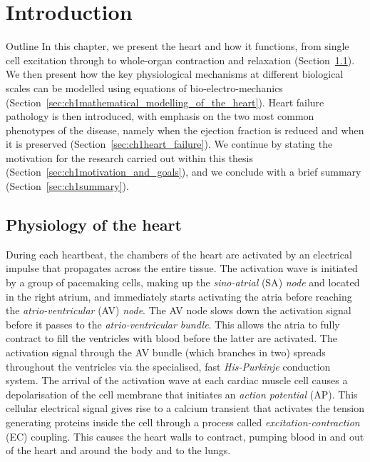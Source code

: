 \chapter{Introduction}\label{cha:chapter1}
%
%
%
\begin{remark}{Outline}
    In this chapter, we present the heart and how it functions, from single cell excitation through to whole-organ contraction and relaxation (Section~\ref{sec:ch1physiology_of_the_heart}). We then present how the key physiological mechanisms at different biological scales can be modelled using equations of bio-electro-mechanics (Section~\ref{sec:ch1mathematical_modelling_of_the_heart}). Heart failure pathology is then introduced, with emphasis on the two most common phenotypes of the disease, namely when the ejection fraction is reduced and when it is preserved (Section~\ref{sec:ch1heart_failure}). We continue by stating the motivation for the research carried out within this thesis (Section~\ref{sec:ch1motivation_and_goals}), and we conclude with a brief summary (Section~\ref{sec:ch1summary}).
\end{remark}


%
%
%
\section{Physiology of the heart}\label{sec:ch1physiology_of_the_heart}
During each heartbeat, the chambers of the heart are activated by an electrical impulse that propagates across the entire tissue. The activation wave is initiated by a group of pacemaking cells, making up the \textit{sino-atrial} (\acs{SA}) \textit{node} and located in the right atrium, and immediately starts activating the atria before reaching the \textit{atrio-ventricular} (\acs{AV}) \textit{node}. The AV node slows down the activation signal before it passes to the \textit{atrio-ventricular bundle}. This allows the atria to fully contract to fill the ventricles with blood before the latter are activated. The activation signal through the AV bundle (which branches in two) spreads throughout the ventricles via the specialised, fast \textit{His-Purkinje} conduction system. The arrival of the activation wave at each cardiac muscle cell causes a depolarisation of the cell membrane that initiates an \textit{action potential} (\acs{AP}). This cellular electrical signal gives rise to a calcium transient that activates the tension generating proteins inside the cell through a process called \textit{excitation-contraction} (\acs{EC}) coupling. This causes the heart walls to contract, pumping blood in and out of the heart and around the body and to the lungs.

